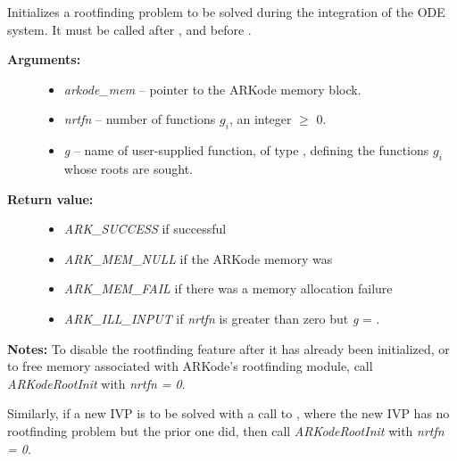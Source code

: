 \documentclass[letterpaper,10pt,english]{sphinxmanual}
\begin{document}
\begin{fulllineitems}
\label{c_interface/User_callable:c.ARKodeRootInit}
Initializes a rootfinding problem to be solved during the
integration of the ODE system.  It must be called after
{\hyperref[c_interface/User_callable:c.ARKodeCreate]{\emph{}}}, and before {\hyperref[c_interface/User_callable:c.ARKode]{\emph{}}}.
\begin{description}
\item[{\textbf{Arguments:}}] \leavevmode\begin{itemize}
\item {} 
\emph{arkode\_mem} -- pointer to the ARKode memory block.

\item {} 
\emph{nrtfn} -- number of functions \(g_i\), an integer \(\ge\) 0.

\item {} 
\emph{g} -- name of user-supplied function, of type {\hyperref[c_interface/User_supplied:c.ARKRootFn]{\emph{}}},
defining the functions \(g_i\) whose roots are sought.

\end{itemize}

\item[{\textbf{Return value:}}] \leavevmode\begin{itemize}
\item {} 
\emph{ARK\_SUCCESS} if successful

\item {} 
\emph{ARK\_MEM\_NULL}  if the ARKode memory was 

\item {} 
\emph{ARK\_MEM\_FAIL}  if there was a memory allocation failure

\item {} 
\emph{ARK\_ILL\_INPUT} if \emph{nrtfn} is greater than zero but \emph{g} = .

\end{itemize}

\end{description}

\textbf{Notes:} To disable the rootfinding feature after it has already
been initialized, or to free memory associated with ARKode's
rootfinding module, call \emph{ARKodeRootInit} with \emph{nrtfn = 0}.

Similarly, if a new IVP is to be solved with a call to
{\hyperref[c_interface/User_callable:c.ARKodeReInit]{\emph{}}}, where the new IVP has no rootfinding
problem but the prior one did, then call \emph{ARKodeRootInit} with
\emph{nrtfn = 0}.

\end{fulllineitems}
\end{document}
